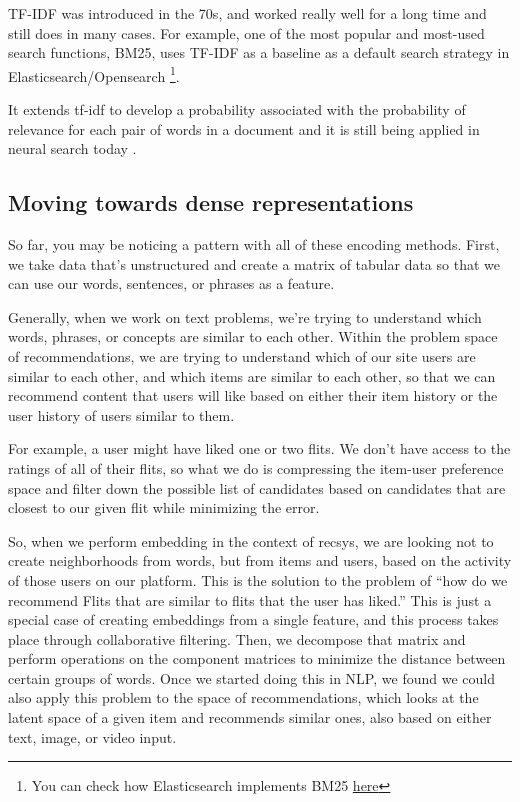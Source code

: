 \documentclass[11pt]{diazessay} %
\begin{document}
TF-IDF was introduced in the 70s, and  worked really well for a long time and still does in many cases.  For example, one of the most popular and most-used search functions, BM25, uses TF-IDF as a baseline \citep{schutze2008introduction} as a default search strategy in Elasticsearch/Opensearch \footnote{You can check how Elasticsearch implements BM25 \href{https://www.elastic.co/blog/practical-bm25-part-1-how-shards-affect-relevance-scoring-in-elasticsearch}{here}}.

It extends tf-idf to develop a probability associated with the probability of relevance for each pair of words in a document and it is still being applied in neural search today \citep{svore2009machine} .  


\subsection{Moving towards dense representations}
So far, you may be noticing a pattern with all of these encoding methods. First, we take data that’s unstructured and create a matrix of tabular data so that we can use our words, sentences, or phrases as a feature. 

Generally, when we work on text problems, we’re trying to understand which words, phrases, or concepts are similar to each other. Within the problem space of recommendations, we are trying to understand which of our site users are similar to each other, and which items are similar to each other, so that we can recommend content that users will like based on either their item history or the user history of users similar to them. 

For example, a user might have liked one or two flits.  We don’t have access to the ratings of all of their flits, so what we do is compressing the item-user preference space and filter down the possible list of candidates based on candidates that are closest to our given flit while minimizing the error. 

So, when we perform embedding in the context of recsys, we are looking not to create neighborhoods from words, but from items and users, based on the activity of those users on our platform.  This is the solution to the problem of “how do we recommend Flits that are similar to flits that the user has liked.” This is just a special case of creating embeddings from a single feature, and this process takes place through collaborative filtering. Then, we decompose that matrix and perform operations on the component matrices to minimize the distance between certain groups of words. Once we started doing this in NLP, we found we could also apply this problem to the space of recommendations, which looks at the latent space of a given item and recommends similar ones, also based on either text, image, or video input.  
\end{document}
